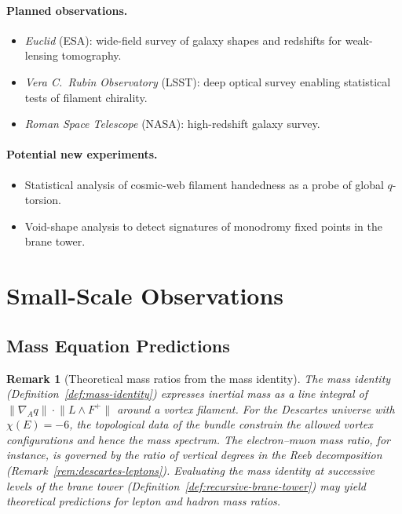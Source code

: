 \documentclass[12pt,a4paper]{report}
\newtheorem{remark}[theorem]{Remark}
\begin{document}
\paragraph{Planned observations.}
\begin{itemize}
  \item \emph{Euclid} (ESA): wide-field survey of galaxy shapes and
        redshifts for weak-lensing tomography.
  \item \emph{Vera C.\ Rubin Observatory} (LSST): deep optical survey
        enabling statistical tests of filament chirality.
  \item \emph{Roman Space Telescope} (NASA): high-redshift galaxy survey.
\end{itemize}

\paragraph{Potential new experiments.}
\begin{itemize}
  \item Statistical analysis of cosmic-web filament handedness as a probe
        of global $q$-torsion.
  \item Void-shape analysis to detect signatures of monodromy fixed points
        in the brane tower.
\end{itemize}



\section{Small-Scale Observations}
\label{sec:small-scale}

\subsection{Mass Equation Predictions}
\label{sec:mass-predictions}

\begin{remark}[Theoretical mass ratios from the mass identity]
\label{rem:mass-ratio-predictions}
The mass identity (Definition~\ref{def:mass-identity}) expresses inertial mass
as a line integral of $\lVert\nabla_A q\rVert \cdot \lVert L \wedge F^+\rVert$
around a vortex filament.  For the Descartes universe with $\chi(E) = -6$, the
topological data of the bundle constrain the allowed vortex configurations and
hence the mass spectrum.  The electron--muon mass ratio, for instance, is
governed by the ratio of vertical degrees in the Reeb decomposition
(Remark~\ref{rem:descartes-leptons}).  Evaluating the mass identity at
successive levels of the brane tower
(Definition~\ref{def:recursive-brane-tower}) may yield theoretical predictions
for lepton and hadron mass ratios.
\end{remark}
\end{document}
